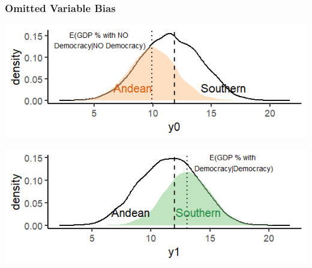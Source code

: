\documentclass[xcolor=x11names,compress]{beamer}\usepackage[]{graphicx}\usepackage[]{xcolor}
\makeatletter
\def\maxwidth{ %
  \ifdim\Gin@nat@width>\linewidth
    \linewidth
  \else
    \Gin@nat@width
  \fi
}
\newenvironment{knitrout}{}{} %
\renewcommand{\(}{\begin{columns}}
\renewcommand{\)}{\end{columns}}
\newcommand{\<}[1]{\begin{column}{#1}}
\renewcommand{\>}{\end{column}}
\makeatother
\begin{document}
\begin{frame}
\frametitle{Omitted Variable Bias}
\begin{knitrout}
\color{fgcolor}
\includegraphics[width=\maxwidth]{figure/OVB3-1} 
\end{knitrout}

\begin{knitrout}
\color{fgcolor}
\includegraphics[width=\maxwidth]{figure/OVB4-1} 
\end{knitrout}
\end{frame}
\end{document}
